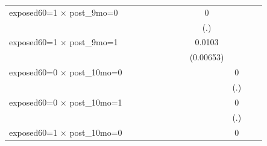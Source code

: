 \begin{table}[htbp]
\begin{tabular}{l*{11}{c}}
\addlinespace
exposed60=1 $\times$ post\_9mo=0&                     &                     &                     &                     &                     &                     &                     &           0         &                     &                     &                     \\
                    &                     &                     &                     &                     &                     &                     &                     &         (.)         &                     &                     &                     \\
\addlinespace
exposed60=1 $\times$ post\_9mo=1&                     &                     &                     &                     &                     &                     &                     &      0.0103         &                     &                     &                     \\
                    &                     &                     &                     &                     &                     &                     &                     &   (0.00653)         &                     &                     &                     \\
\addlinespace
exposed60=0 $\times$ post\_10mo=0&                     &                     &                     &                     &                     &                     &                     &                     &           0         &                     &                     \\
                    &                     &                     &                     &                     &                     &                     &                     &                     &         (.)         &                     &                     \\
\addlinespace
exposed60=0 $\times$ post\_10mo=1&                     &                     &                     &                     &                     &                     &                     &                     &           0         &                     &                     \\
                    &                     &                     &                     &                     &                     &                     &                     &                     &         (.)         &                     &                     \\
\addlinespace
exposed60=1 $\times$ post\_10mo=0&                     &                     &                     &                     &                     &                     &                     &                     &           0         &                     &                     \\

\end{tabular}
\end{table}
